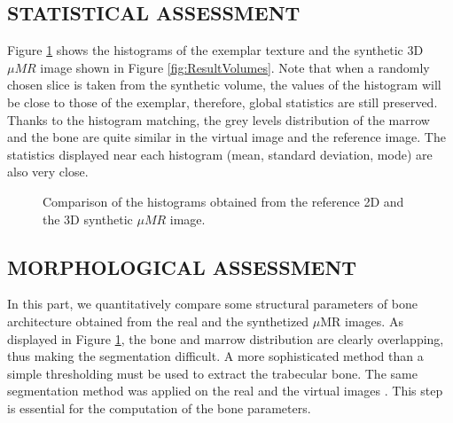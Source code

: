 \documentclass{article}
\begin{document}
\subsection{\uppercase{Statistical assessment }}
\label{sec:Statistics}
%
Figure \ref{fig:histograms} shows the histograms of the exemplar texture and the synthetic 3D $\mu{MR}$ 
image shown in Figure \ref{fig:ResultVolumes}. 
Note that when a randomly chosen slice is taken from the synthetic volume, the values of the histogram will be close to those of the exemplar,
therefore, global statistics are still preserved. 
Thanks to the histogram matching, 
the grey levels distribution of the marrow and the bone are quite similar in the virtual image and the reference image. 
The statistics displayed near each histogram (mean, standard deviation, mode) are also very close.
%
\begin{figure}
 \centering 
\caption{Comparison of the histograms obtained from the reference 2D and the 3D synthetic $\mu{MR}$ image.}
 \label{fig:histograms}
\end{figure}

\subsection{\uppercase{Morphological assessment}}
\label{sec:Morphology}
\noindent
In this part, we quantitatively compare some structural parameters of bone architecture obtained from the real and the synthetized $\mu$MR images.
As displayed in Figure \ref{fig:histograms}, the bone and marrow distribution are clearly overlapping, thus making the segmentation difficult. A more sophisticated method than a simple thresholding must be used to extract the trabecular bone. The same segmentation method was applied on the real and the virtual images \cite{PR2002}. This step is essential for the computation of the bone parameters.  %
\end{document}
